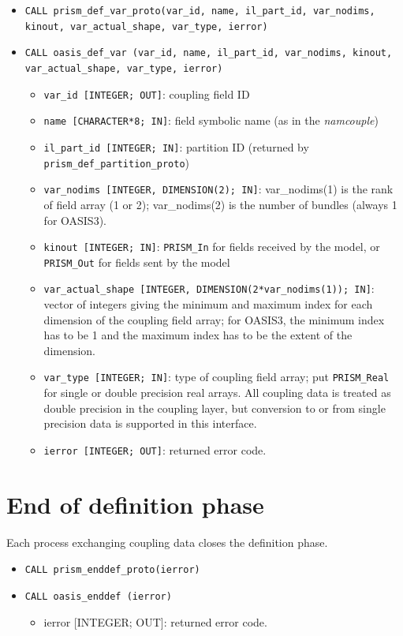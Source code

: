 \begin{itemize}

\item {\tt CALL prism\_def\_var\_proto(var\_id, name, il\_part\_id,
  var\_nodims, kinout, var\_actual\_shape, var\_type, ierror)}
\item {\tt CALL oasis\_def\_var       (var\_id, name, il\_part\_id,
  var\_nodims, kinout, var\_actual\_shape, var\_type, ierror)}

\begin{itemize}
 \item {\tt var\_id [INTEGER; OUT]}: coupling field ID
 \item {\tt name [CHARACTER*8; IN]}: field symbolic name (as in the
   {\it namcouple})
 \item {\tt il\_part\_id [INTEGER; IN]}: partition ID (returned by
   {\tt prism\_def\_partition\-\_proto})
 \item {\tt var\_nodims [INTEGER, DIMENSION(2); IN]}: var\_nodims(1) is
   the rank of field array (1 or 2); var\_nodims(2) is the number of
   bundles (always 1 for OASIS3). 
 \item {\tt kinout [INTEGER; IN]}: {\tt PRISM\_In} for fields received by
   the model, or {\tt PRISM\_Out} for fields sent by the model 
 \item {\tt var\_actual\_shape [INTEGER, DIMENSION(2*var\_nodims(1)); IN]}: 
   vector of integers giving the minimum and maximum index for each
   dimension of the coupling field array; for OASIS3, the minimum
   index has to be 1 and the maximum index has to be the extent of the
   dimension.
 \item {\tt var\_type [INTEGER; IN]}: type of coupling field array;
   put {\tt PRISM\_Real} for single or double precision real
   arrays.  All coupling data is treated as double precision in the
   coupling layer, but conversion to or from single precision data
   is supported in this interface.
 \item {\tt ierror [INTEGER; OUT]}: returned error code. 
\end{itemize}
\end{itemize}

\section{End of definition phase}
\label{subsubsec_Endofdefinition}
Each process exchanging coupling data closes the definition phase.
\begin{itemize}
\item {\tt CALL prism\_enddef\_proto(ierror)}
\item {\tt CALL oasis\_enddef       (ierror)}
\begin{itemize}
  \item ierror [INTEGER; OUT]: returned error code.
\end{itemize}
\end{itemize}

